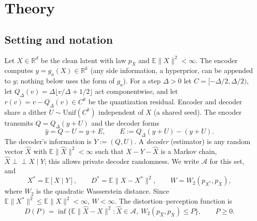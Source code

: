 
\providecommand{\E}{\mathbb{E}}
\providecommand{\R}{\mathbb{R}}
\providecommand{\Prob}{\mathbb{P}}
\providecommand{\Law}{\mathrm{Law}}
\providecommand{\Unif}{\mathrm{Unif}}
\providecommand{\Leb}{\mathcal{L}}
\providecommand{\indep}{\perp\!\!\!\perp}
\newcommand{\Xs}{X^{*}}
\newcommand{\Ds}{D^{*}}
\newcommand{\Adm}{\mathcal{A}}
\newcommand{\Wtwo}{W_2}

\section{Theory}
\label{sec:app-theory}

\subsection{Setting and notation}
\label{sec:app-setting}

Let $X\in\R^d$ be the clean latent with law $p_X$ and $\E\|X\|^2<\infty$.
The encoder computes $y=g_a(X)\in\R^k$ (any side information, \eg a hyperprior, can be appended to $y$; nothing below uses the form of $g_a$).
For a step $\Delta>0$ let $C=[-\Delta/2,\Delta/2)$, let $Q_\Delta(v)=\Delta\lfloor v/\Delta+1/2\rfloor$ act componentwise, and let $r(v)=v-Q_\Delta(v)\in C^k$ be the quantization residual.
Encoder and decoder share a dither $U\sim\Unif(C^k)$ independent of $X$ (a shared seed).
The encoder transmits $Q=Q_\Delta(y+U)$ and the decoder forms
\begin{equation}
  \hat y = Q-U = y+E, \qquad E := Q_\Delta(y+U)-(y+U) .
\end{equation}
The decoder's information is $Y:=(Q,U)$. A \emph{decoder} (estimator) is any random vector $\hat X$ with $\E\|\hat X\|^2<\infty$ such that $X - Y - \hat X$ is a Markov chain, \ie $\hat X \indep X \mid Y$; this allows private decoder randomness. We write $\Adm$ for this set, and
\begin{equation}
  \Xs=\E[X\mid Y],\qquad \Ds=\E\|X-\Xs\|^2,\qquad W=\Wtwo(p_{\Xs},p_X),
\end{equation}
where $\Wtwo$ is the quadratic Wasserstein distance. Since $\E\|\Xs\|^2\le\E\|X\|^2<\infty$, $W<\infty$. The distortion--perception function is
\begin{equation}
  D(P)=\inf\bigl\{\E\|\hat X-X\|^2 : \hat X\in\Adm,\ \Wtwo(p_{\hat X},p_X)\le P\bigr\},\qquad P\ge 0 .
\end{equation}


